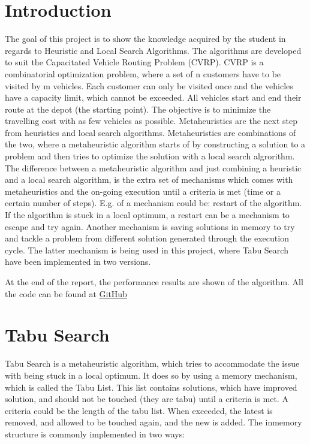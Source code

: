 \documentclass[12pt]{article}
\begin{document}
\section{Introduction}

The goal of this project is to show the knowledge acquired by the student in regards to Heuristic\- and Local Search Algorithms. The algorithms are developed to suit the Capacitated Vehicle Routing Problem (CVRP). CVRP is a combinatorial optimization problem, where a set of n customers have to be visited by m vehicles. Each customer can only be visited once and the vehicles have a capacity limit, which cannot be exceeded. All vehicles start and end their route at the depot (the starting point). The objective is to minimize the travelling cost with as few vehicles as possible.  
Metaheuristics are the next step from heuristics and local search algorithms. Metaheuristics are combinations of the two, where a metaheuristic algorithm starts of by constructing a solution to a problem and then tries to optimize the solution with a local search algrorithm. The difference between a metaheuristic algorithm and just combining a heuristic\- and a local search algorithm, is the extra set of mechanisms which comes with metaheuristics and the on-going execution until a criteria is met (time or a certain number of steps). E.g. of a mechanism could be: restart of the algorithm. If the algorithm is stuck in a local optimum, a restart can be a mechanism to escape and try again. Another mechanism is saving solutions in memory to try and tackle a problem from different solution generated through the execution cycle.  
The latter mechanism is being used in this project, where Tabu Search have been implemented in two versions. 

At the end of the report, the performance results are shown of the algorithm.
All the code can be found at \href{https://github.com/AlexanderFalk/2020_Project01_CS_HA}{GitHub}  

\newpage

\section{Tabu Search} 

Tabu Search \cite{brownlee:1} is a metaheuristic algorithm, which tries to accommodate the issue with being stuck in a local optimum. It does so by using a memory mechanism, which is called the Tabu List. This list contains solutions, which have improved solution, and should not be touched (they are tabu) until a criteria is met. A criteria could be the length of the tabu list. When exceeded, the latest is removed, and allowed to be touched again, and the new is added. 
The in\-memory structure is commonly implemented in two ways:
\end{document}
